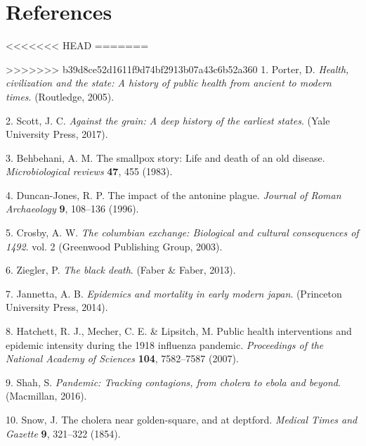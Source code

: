 \documentclass[]{article}
\begin{document}
\hypertarget{references}{%
\section*{References}\label{references}}

\hypertarget{refs}{}
<<<<<<< HEAD
=======
\begin{cslreferences}
>>>>>>> b39d8ce52d1611f9d74bf2913b07a43c6b52a360
\leavevmode\hypertarget{ref-porter2005health}{}%
1. Porter, D. \emph{Health, civilization and the state: A history of public health from ancient to modern times}. (Routledge, 2005).

\leavevmode\hypertarget{ref-scott2017against}{}%
2. Scott, J. C. \emph{Against the grain: A deep history of the earliest states}. (Yale University Press, 2017).

\leavevmode\hypertarget{ref-behbehani1983smallpox}{}%
3. Behbehani, A. M. The smallpox story: Life and death of an old disease. \emph{Microbiological reviews} \textbf{47}, 455 (1983).

\leavevmode\hypertarget{ref-duncan1996impact}{}%
4. Duncan-Jones, R. P. The impact of the antonine plague. \emph{Journal of Roman Archaeology} \textbf{9}, 108--136 (1996).

\leavevmode\hypertarget{ref-crosby2003columbian}{}%
5. Crosby, A. W. \emph{The columbian exchange: Biological and cultural consequences of 1492}. vol. 2 (Greenwood Publishing Group, 2003).

\leavevmode\hypertarget{ref-ziegler2013black}{}%
6. Ziegler, P. \emph{The black death}. (Faber \& Faber, 2013).

\leavevmode\hypertarget{ref-jannetta2014epidemics}{}%
7. Jannetta, A. B. \emph{Epidemics and mortality in early modern japan}. (Princeton University Press, 2014).

\leavevmode\hypertarget{ref-hatchett2007public}{}%
8. Hatchett, R. J., Mecher, C. E. \& Lipsitch, M. Public health interventions and epidemic intensity during the 1918 influenza pandemic. \emph{Proceedings of the National Academy of Sciences} \textbf{104}, 7582--7587 (2007).

\leavevmode\hypertarget{ref-shah2016pandemic}{}%
9. Shah, S. \emph{Pandemic: Tracking contagions, from cholera to ebola and beyond}. (Macmillan, 2016).

\leavevmode\hypertarget{ref-snow1854cholera}{}%
10. Snow, J. The cholera near golden-square, and at deptford. \emph{Medical Times and Gazette} \textbf{9}, 321--322 (1854).


\end{cslreferences}
\end{document}
